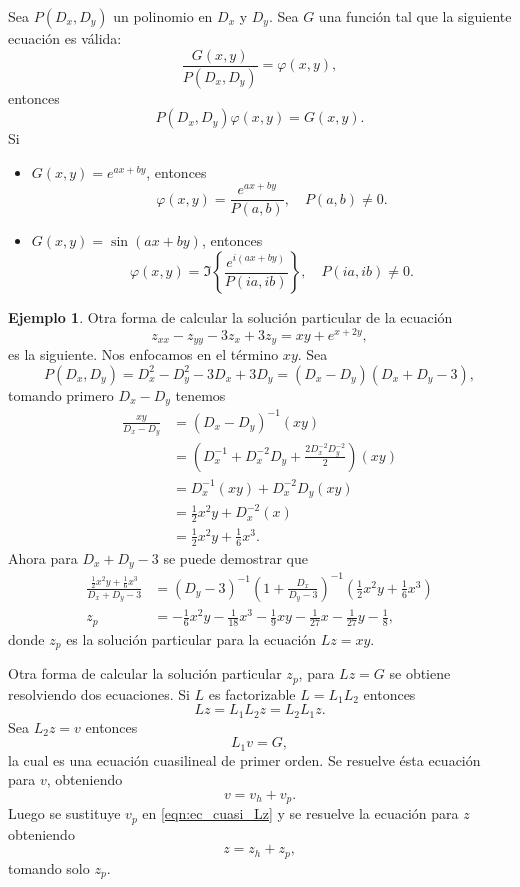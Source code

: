 \documentclass[11pt,letterpaper,draft]{report}
\theoremstyle{plain}
\theoremstyle{definition}
\newtheorem{example}[theorem]{Ejemplo}
\theoremstyle{remark}
\newcommand\<{\langle}
\renewcommand\>{\rangle}
\renewcommand\phi\varphi
\begin{document}
Sea $P(D_x,D_y)$ un polinomio en $D_x$ y $D_y$. Sea $G$ una
función tal que la siguiente ecuación es válida:
\[
\frac{G(x,y)}{P(D_x,D_y)} = \phi(x,y),
\] 
entonces
\[
P(D_x,D_y) \phi(x,y) = G(x,y).
\] 
Si
\begin{itemize}
  \item $\displaystyle G(x,y) = e^{ax+by}$, entonces
    \[
    \phi(x,y) = \frac{e^{ax+by}}{P(a,b)}, \quad P(a,b) \neq
    0.
    \] 
  \item $\displaystyle G(x,y) = \sin(ax+by)$, entonces
    \[
    \phi(x,y) = \Im \left\{
      \frac{e^{i(ax+by)}}{P(ia,ib)}
    \right\}, \quad P(ia, ib) \neq 0.
    \] 
\end{itemize}
\begin{example}
  Otra forma de calcular la solución particular de la
  ecuación
  \[
  z_{xx} - z_{yy} - 3z_x + 3z_y = xy + e^{x+2y},
  \] 
  es la siguiente. Nos enfocamos en el término $xy$. Sea
  \[
  P(D_x,D_y) = D_x^2 - D_y^2 - 3D_x + 3D_y = (D_x -
  D_y)(D_x+D_y-3),
  \] 
  tomando primero $D_x - D_y$ tenemos
  \begin{align*}
    \frac{xy}{D_x-D_y} &= (D_x - D_y)^{-1}(xy)\\
                       &= \left(
                         D_x^{-1} + D_x^{-2}D_y +
                         \frac{2D_x^{-2}D_y^{-2}}{2}
                       \right)(xy)\\
                       &= D_x^{-1}(xy) + D_x^{-2}D_y(xy)\\
                       &= \frac{1}{2}x^2y + D_x^{-2}(x)\\
                       &= \frac{1}{2}x^2y + \frac{1}{6}x^3.
  \end{align*}
  Ahora para $D_x+D_y-3$ se puede demostrar que
  \begin{align*}
    \frac{\frac{1}{2}x^2y + \frac{1}{6}x^3}{D_x+D_y-3}
    &= (D_y-3)^{-1}\left(1+\frac{D_x}{D_y-3}\right)^{-1}
       \left(\frac{1}{2}x^2y+\frac{1}{6}x^3\right)\\
    z_p &= -\frac{1}{6}x^2y - \frac{1}{18}x^3 - \frac{1}{9}xy -
    \frac{1}{27}x - \frac{1}{27}y - \frac{1}{8},
  \end{align*}
  donde $z_p$ es la solución particular para la ecuación $Lz
  = xy$.
\end{example}

Otra forma de calcular la solución particular $z_p$, para
$Lz = G$ se obtiene resolviendo dos ecuaciones. Si $L$ es
factorizable $L = L_1 L_2$ entonces
\[
Lz = L_1L_2z = L_2L_1z.
\] 
Sea $L_2z = v$ entonces
\begin{equation}
  \label{eqn:ec_cuasi_Lz}
  L_1v = G,
\end{equation}
la cual es una ecuación cuasilineal de primer orden. Se
resuelve ésta ecuación para $v$, obteniendo
\[
v = v_h + v_p.
\] 
Luego se sustituye $v_p$ en \ref{eqn:ec_cuasi_Lz} y se
resuelve la ecuación para $z$ obteniendo
\[
z = z_h + z_p,
\]
tomando solo $z_p$.
\end{document}
